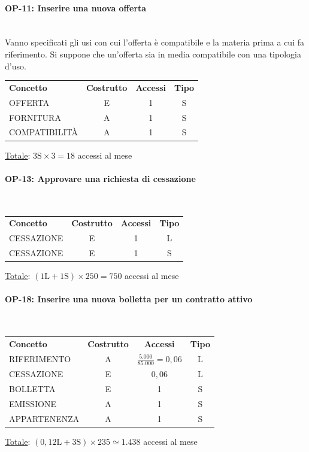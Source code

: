 \documentclass[a4paper,12pt]{report}
\begin{document}
\paragraph{OP-11: Inserire una nuova offerta}\mbox{}\\
    Vanno specificati gli usi con cui l'offerta è compatibile e la materia prima a cui fa riferimento. Si suppone che un'offerta sia in media compatibile con una tipologia d'uso.
    \begin{center}
    \begin{tabular}{@{}l c  c  c@{}}
        \hline
        \textbf{Concetto} & \textbf{Costrutto} & \textbf{Accessi} & \textbf{Tipo} \\ [0.5ex]
        OFFERTA & E & 1 & S \\
        FORNITURA & A & 1 & S \\
        COMPATIBILITÀ & A & 1 & S \\
        \hline
    \end{tabular}
    \end{center}
    \underline{Totale}: $3\text{S} \times 3 = 18$ accessi al mese
\paragraph{OP-13: Approvare una richiesta di cessazione}\mbox{}\\
\begin{center}
\begin{tabular}{@{}l c  c  c@{}}
    \hline
    \textbf{Concetto} & \textbf{Costrutto} & \textbf{Accessi} & \textbf{Tipo} \\ [0.5ex]
    CESSAZIONE & E & 1 & L \\
    CESSAZIONE & E & 1 & S \\
    \hline
\end{tabular}
\end{center}
\underline{Totale}: $(1\text{L} + 1\text{S}) \times 250 = 750$ accessi al mese
\paragraph{OP-18: Inserire una nuova bolletta per un contratto attivo}\mbox{}\\
\begin{center}
\begin{tabular}{@{}l c  c  c@{}}
    \hline
    \textbf{Concetto} & \textbf{Costrutto} & \textbf{Accessi} & \textbf{Tipo} \\ [0.5ex]
    RIFERIMENTO & A & $\frac{5.000}{85.000} = 0,06$ & L \\
    CESSAZIONE & E & $0,06$ & L \\
    BOLLETTA & E & 1 & S \\
    EMISSIONE & A & 1 & S \\
    APPARTENENZA & A & 1 & S \\
    \hline
\end{tabular}
\end{center}
\underline{Totale}: $(0,12\text{L} + 3\text{S}) \times 235 \simeq 1.438$ accessi al mese
\end{document}
